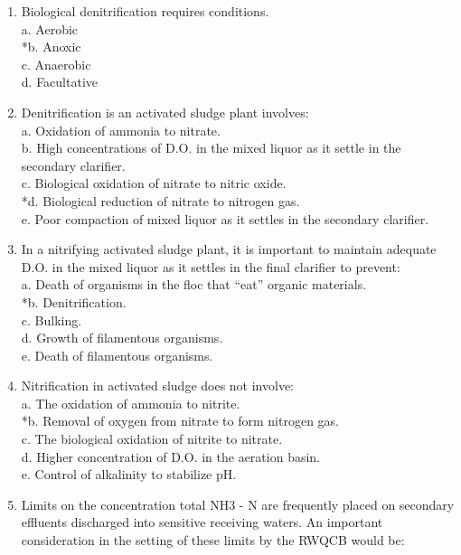 \begin{enumerate}
\item Biological denitrification requires {\underline{\hspace{1cm}}} conditions. \\

a. Aerobic \\
*b. Anoxic \\
c. Anaerobic \\
d. Facultative 

\item Denitrification is an activated sludge plant involves: \\

a. Oxidation of ammonia to nitrate. \\
b. High concentrations of D.O. in the mixed liquor as it settle in the secondary clarifier. \\
c. Biological oxidation of nitrate to nitric oxide. \\
*d. Biological reduction of nitrate to nitrogen gas. \\
e. Poor compaction of mixed liquor as it settles in the secondary clarifier. 

\item In a nitrifying activated sludge plant, it is important to maintain adequate D.O. in the mixed liquor as it settles in the final clarifier to prevent: \\

a. Death of organisms in the floc that “eat” organic materials. \\
*b. Denitrification. \\
c. Bulking. \\
d. Growth of filamentous organisms. \\
e. Death of filamentous organisms. 

\item Nitrification in activated sludge does not involve: \\

a. The oxidation of ammonia to nitrite. \\
*b. Removal of oxygen from nitrate to form nitrogen gas. \\
c. The biological oxidation of nitrite to nitrate. \\
d. Higher concentration of D.O. in the aeration basin. \\
e. Control of alkalinity to stabilize pH. 

\item Limits on the concentration total NH3 - N are frequently placed on secondary effluents discharged into sensitive receiving waters. An important consideration in the setting of these limits by the RWQCB would be: \\


\end{enumerate}
